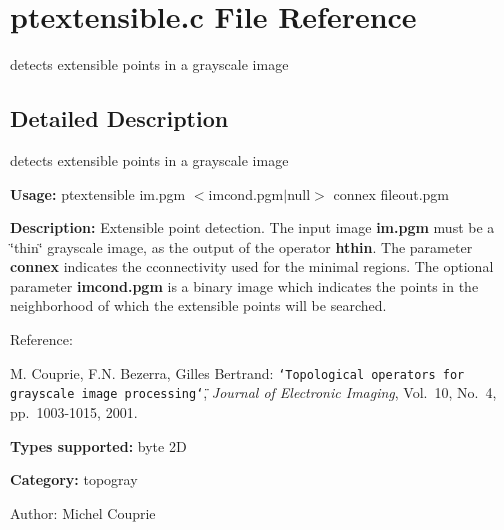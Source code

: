 \section{ptextensible.c File Reference}
\label{ptextensible_8c}
detects extensible points in a grayscale image 



\subsection{Detailed Description}
detects extensible points in a grayscale image 

{\bf Usage:} ptextensible im.pgm $<$imcond.pgm$|$null$>$ connex fileout.pgm

{\bf Description:} Extensible point detection. The input image {\bf im.pgm} must be a \char`\"{}thin\char`\"{} grayscale image, as the output of the operator {\bf hthin}. The parameter {\bf connex} indicates the cconnectivity used for the minimal regions. The optional parameter {\bf imcond.pgm} is a binary image which indicates the points in the neighborhood of which the extensible points will be searched.

Reference:\par
 M. Couprie, F.N. Bezerra, Gilles Bertrand: {\tt \char`\"{}Topological operators for grayscale image processing\char`\"{}}, {\em  Journal of Electronic Imaging\/}, Vol.~10, No.~4, pp.~1003-1015, 2001.

{\bf Types supported:} byte 2D

{\bf Category:} topogray

\begin{Desc}
\item[Author:]Michel Couprie \end{Desc}
